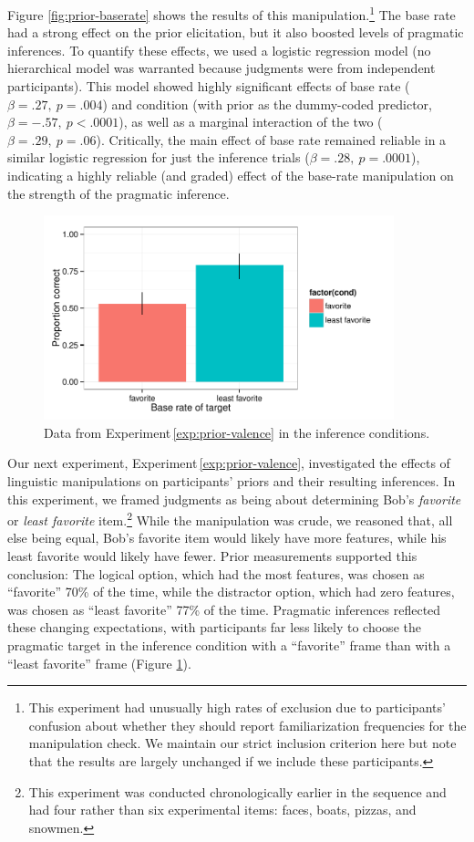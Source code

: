 \documentclass[man,noapacite]{apa2}
\newcounter{Experiment}
\newcommand{\exptref}[1]{Experiment\,\ref{#1}}
\begin{document}
Figure \ref{fig:prior-baserate} shows the results of this manipulation.\footnote{This experiment had unusually high rates of exclusion due to participants' confusion about whether they should report  familiarization frequencies for the manipulation check. We maintain our strict inclusion criterion here but note that the results are largely unchanged if we include these participants.}  The base rate had a strong effect on the prior elicitation, but it also boosted levels of pragmatic inferences. To quantify these effects, we used a logistic regression model (no hierarchical model was warranted because judgments were from independent participants). This model showed highly significant effects of base rate ($\beta = .27,~p = .004$) and condition  (with prior as the dummy-coded predictor, $\beta = -.57,~p < .0001$), as well as a marginal interaction of the two  ($\beta = .29,~p = .06$). Critically, the main effect of base rate remained reliable in a similar logistic regression for just the inference trials ($\beta = .28,~p = .0001$), indicating a highly reliable (and graded) effect of the base-rate manipulation on the strength of the pragmatic inference.


\begin{figure}[t]
  \centering
  \includegraphics[width=4in]{../plots/2-prior-valence.pdf}
  \caption{\label{fig:prior-valence} Data from \exptref{exp:prior-valence} in the inference conditions.}
\end{figure}

Our next experiment, \exptref{exp:prior-valence}, investigated the effects of linguistic manipulations on participants' priors and their resulting inferences. In this experiment, we framed judgments as being about determining Bob's \emph{favorite} or \emph{least favorite} item.\footnote{This experiment was conducted chronologically earlier in the sequence and had four rather than six experimental items: faces, boats, pizzas, and snowmen.} While the manipulation was crude, we reasoned that, all else being equal, Bob's favorite item would likely have more features, while his least favorite would likely have fewer. Prior measurements supported this conclusion: The logical option, which had the most features, was chosen as ``favorite'' 70\% of the time, while the distractor option, which had zero features, was chosen as ``least favorite'' 77\% of the time. Pragmatic inferences reflected these changing expectations, with participants far less likely to choose the pragmatic target in the inference condition with a ``favorite'' frame than with a ``least favorite'' frame (Figure \ref{fig:prior-valence}).
\end{document}
